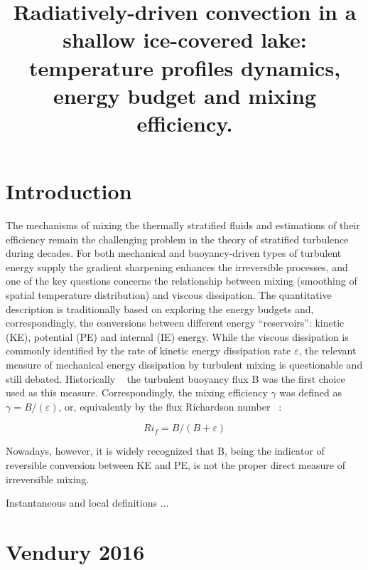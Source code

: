 \documentclass{article}
\title{Radiatively-driven convection in a shallow ice-covered lake: 
temperature profiles dynamics, energy budget and mixing efficiency.
}
\author{}
\begin{document}
\maketitle

\section{Introduction}
The mechanisms of mixing the thermally stratified fluids and estimations of their efficiency remain the challenging problem in the theory of stratified turbulence during decades. For both mechanical and buoyancy-driven types of turbulent energy supply the gradient sharpening enhances the irreversible processes, and one of the key questions concerns the relationship between mixing (smoothing of spatial temperature distribution) and viscous dissipation. The quantitative description is traditionally based on exploring the energy budgets and, correspondingly, the conversions between different energy “reservoirs”: kinetic (KE), potential (PE) and internal (IE) energy. While the viscous dissipation is commonly identified by the rate of kinetic energy dissipation rate $\varepsilon$, the relevant measure of mechanical energy dissipation by turbulent mixing is questionable and still debated. Historically ~\cite{turner_buoyancy_1973,Lorenz1955}
the turbulent buoyancy flux B was the first choice used as this measure. Correspondingly, the  mixing efficiency $\gamma$ was defined as $\gamma = B/(\varepsilon)$, or, equivalently by the flux Richardson number ~\cite{Ivey,Imberger, 1991}:   

\begin{equation}\label{eq:Ri}
Ri_f = B/(B+\varepsilon)
\end{equation}

Nowadays, however, it is widely recognized that B, being the indicator of reversible conversion between KE and PE, is not the proper direct measure of irreversible mixing.   


Instantaneous and local definitions ...

\section{Vendury 2016}
\end{document}
